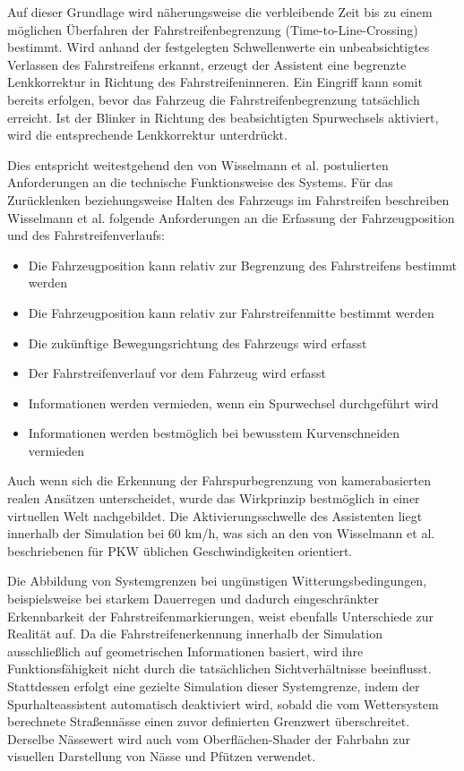 Auf dieser Grundlage wird näherungsweise die verbleibende Zeit bis zu einem möglichen Überfahren der Fahrstreifenbegrenzung (Time-to-Line-Crossing) bestimmt. Wird anhand der festgelegten Schwellenwerte ein unbeabsichtigtes Verlassen des Fahrstreifens erkannt, erzeugt der Assistent eine begrenzte Lenkkorrektur in Richtung des Fahrstreifeninneren. Ein Eingriff kann somit bereits erfolgen, bevor das Fahrzeug die Fahrstreifenbegrenzung tatsächlich erreicht. Ist der Blinker in Richtung des beabsichtigten Spurwechsels aktiviert, wird die entsprechende Lenkkorrektur unterdrückt.

Dies entspricht weitestgehend den von Wisselmann et al. \cite{wisselmann2024querfuehrungsassistenz} postulierten Anforderungen an die technische Funktionsweise des Systems. Für das Zurücklenken beziehungsweise Halten des Fahrzeugs im Fahrstreifen beschreiben Wisselmann et al. \cite{wisselmann2024querfuehrungsassistenz} folgende Anforderungen an die Erfassung der Fahrzeugposition und des Fahrstreifenverlaufs:

\begin{itemize}
    \item Die Fahrzeugposition kann relativ zur Begrenzung des Fahrstreifens bestimmt werden
    \item Die Fahrzeugposition kann relativ zur Fahrstreifenmitte bestimmt werden
    \item Die zukünftige Bewegungsrichtung des Fahrzeugs wird erfasst
    \item Der Fahrstreifenverlauf vor dem Fahrzeug wird erfasst
    \item Informationen werden vermieden, wenn ein Spurwechsel durchgeführt wird
    \item Informationen werden bestmöglich bei bewusstem Kurvenschneiden vermieden
\end{itemize}

Auch wenn sich die Erkennung der Fahrspurbegrenzung von kamerabasierten realen Ansätzen unterscheidet, wurde das Wirkprinzip bestmöglich in einer virtuellen Welt nachgebildet. Die Aktivierungsschwelle des Assistenten liegt innerhalb der Simulation bei 60 km/h, was sich an den von Wisselmann et al. \cite{wisselmann2024querfuehrungsassistenz} beschriebenen für PKW üblichen Geschwindigkeiten orientiert. 

Die Abbildung von Systemgrenzen bei ungünstigen Witterungsbedingungen, beispielsweise bei starkem Dauerregen und dadurch eingeschränkter Erkennbarkeit der Fahrstreifenmarkierungen, weist ebenfalls Unterschiede zur Realität auf. Da die Fahrstreifenerkennung innerhalb der Simulation ausschließlich auf geometrischen Informationen basiert, wird ihre Funktionsfähigkeit nicht durch die tatsächlichen Sichtverhältnisse beeinflusst. Stattdessen erfolgt eine gezielte Simulation dieser Systemgrenze, indem der Spurhalteassistent automatisch deaktiviert wird, sobald die vom Wettersystem berechnete Straßennässe einen zuvor definierten Grenzwert überschreitet. Derselbe Nässewert wird auch vom Oberflächen-Shader der Fahrbahn zur visuellen Darstellung von Nässe und Pfützen verwendet.


